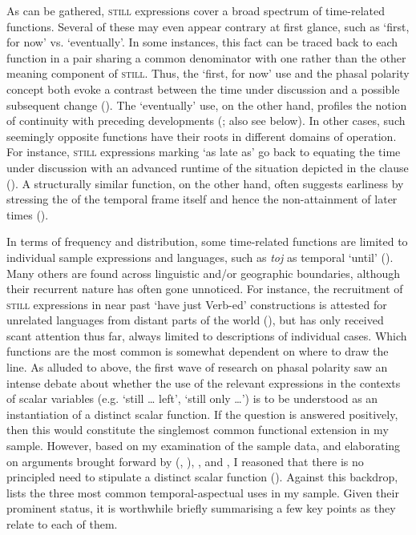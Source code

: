 As can be gathered, \textsc{still} expressions cover a broad spectrum of time-related functions. Several of these may even appear contrary at first glance, such as \lq first, for now\rq{ }vs. \lq eventually\rq{}. In some instances, this fact can be traced back to each function in a pair sharing a common denominator with one rather than the other meaning component of \textsc{still}. Thus, the \lq first, for now\rq{ }use and the phasal polarity concept both evoke a contrast between the time under discussion and a possible subsequent change (). The \lq eventually\rq{ }use, on the other hand, profiles the notion of continuity with preceding developments (; also see below). In other cases, such seemingly opposite functions have their roots in different domains of operation. For instance, \textsc{still} expressions marking \lq as late as\rq{ }go back to equating the time under discussion with an advanced runtime of the situation depicted in the clause (). A structurally similar function, on the other hand, often suggests earliness by stressing the  of the temporal frame itself and hence the non-attainment of later times ().

In terms of frequency and distribution, some time-related functions are limited to individual sample expressions and languages, such as  \textit{toj} as temporal \lq until\rq{ }(). Many others are found across linguistic and/or geographic boundaries, although their recurrent nature has often gone unnoticed. For instance, the recruitment of \textsc{still} expressions in near past \lq have just Verb-ed\rq{} constructions is attested for unrelated languages from distant parts of the world (), but has only received scant attention thus far, always limited to descriptions of individual cases. Which functions are the most common is somewhat dependent on where to draw the line. As alluded to above, the first wave of research on phasal polarity saw an intense debate about whether the use of the relevant expressions in the contexts of scalar variables (e.g. \lq still … left\rq{}, \lq still only …\rq) is to be understood as an instantiation of a distinct scalar function. If the question is answered positively, then this would constitute the singlemost common functional extension in my sample. However, based on my examination of the sample data, and elaborating on arguments brought forward by \citeauthor{vanderAuwera1991BeyondDuality} (\citeyear{vanderAuwera1991BeyondDuality}, \citeyear{vanderAuwera1993}), \textcite{Garrido1992}, and \textcite[ch. 3.1]{MosegaardHansen2008}, I reasoned that there is no principled need to stipulate a distinct scalar function (). Against this backdrop,  lists the three most common temporal-aspectual uses in my sample. Given their prominent status, it is worthwhile briefly summarising a few key points as they relate to each of them.


